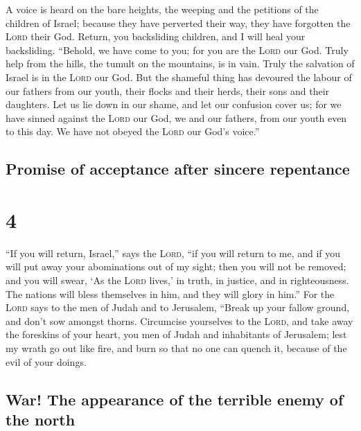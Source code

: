  A voice is heard on the bare heights, the weeping and
the petitions of the children of Israel; because they have perverted
their way, they have forgotten the \textsc{Lord} their God.
 Return, you backsliding children, and I will heal your
backsliding. ``Behold, we have come to you; for you are the
\textsc{Lord} our God.  Truly help from the hills, the
tumult on the mountains, is in vain. Truly the salvation of Israel is in
the \textsc{Lord} our God.  But the shameful thing has
devoured the labour of our fathers from our youth, their flocks and
their herds, their sons and their daughters.  Let us lie
down in our shame, and let our confusion cover us; for we have sinned
against the \textsc{Lord} our God, we and our fathers, from our youth
even to this day. We have not obeyed the \textsc{Lord} our God's
voice.''

\hypertarget{promise-of-acceptance-after-sincere-repentance}{%
\subsection{Promise of acceptance after sincere
repentance}\label{promise-of-acceptance-after-sincere-repentance}}

\hypertarget{section-3}{%
\section{4}\label{section-3}}

 ``If you will return, Israel,'' says the \textsc{Lord},
``if you will return to me, and if you will put away your abominations
out of my sight; then you will not be removed;  and you
will swear, `As the \textsc{Lord} lives,' in truth, in justice, and in
righteousness. The nations will bless themselves in him, and they will
glory in him.''  For the \textsc{Lord} says to the men of
Judah and to Jerusalem, ``Break up your fallow ground, and don't sow
amongst thorns.  Circumcise yourselves to the
\textsc{Lord}, and take away the foreskins of your heart, you men of
Judah and inhabitants of Jerusalem; lest my wrath go out like fire, and
burn so that no one can quench it, because of the evil of your doings.

\hypertarget{war-the-appearance-of-the-terrible-enemy-of-the-north}{%
\subsection{War! The appearance of the terrible enemy of the
north}\label{war-the-appearance-of-the-terrible-enemy-of-the-north}}

